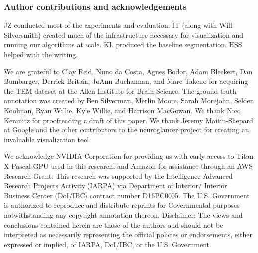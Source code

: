 \documentclass{article}
\begin{document}


\subsubsection*{Author contributions and acknowledgements}
JZ conducted most of the experiments and evaluation. IT (along with Will
Silversmith) created much of the infrastructure necessary for visualization and
running our algorithms at scale. KL produced the baseline segmentation. HSS
helped with the writing.

We are grateful to Clay Reid, Nuno da Costa, Agnes Bodor, Adam Bleckert, Dan Bumbarger, Derrick Britain, JoAnn Buchannan, and Marc Takeno for acquiring the TEM dataset at the Allen Institute for Brain Science.
The ground truth annotation was created by Ben Silverman, Merlin Moore, Sarah Morejohn, Selden Koolman, Ryan Willie, Kyle Willie, and Harrison MacGowan.
We thank Nico Kemnitz for proofreading a draft of this paper. We thank
Jeremy Maitin-Shepard at Google and the other contributors to the neuroglancer project for creating an invaluable visualization tool.

We acknowledge NVIDIA Corporation for providing us with early access to Titan X
Pascal GPU used in this research, and Amazon for assistance through an AWS Research Grant. This research was supported by the Intelligence Advanced
Research Projects Activity (IARPA) via Department of Interior/ Interior Business Center (DoI/IBC)
contract number D16PC0005. The U.S. Government is authorized to reproduce and distribute reprints
for Governmental purposes notwithstanding any copyright annotation thereon. Disclaimer: The views
and conclusions contained herein are those of the authors and should not be interpreted as necessarily
representing the official policies or endorsements, either expressed or implied, of IARPA, DoI/IBC,
or the U.S. Government.


\end{document}
